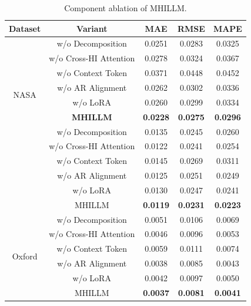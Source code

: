 \documentclass[preprint,12pt]{elsarticle}
\begin{document}
\begin{table}[t]
\centering
\caption{Component ablation of MHILLM.}
\label{tab:component_ablation}
\setlength{\tabcolsep}{8pt}
\renewcommand{\arraystretch}{1.15}
\begin{tabular}{c|c|ccc}
\hline
\textbf{Dataset} & \textbf{Variant} & \textbf{MAE} & \textbf{RMSE} & \textbf{MAPE} \\
\hline
\multirow{8}{*}{NASA}
& w/o Decomposition      & 0.0251 & 0.0283 & 0.0325 \\
& w/o Cross-HI Attention & 0.0278 & 0.0324 & 0.0367 \\
& w/o Context Token      & 0.0371 & 0.0448 & 0.0452 \\
& w/o AR Alignment       & 0.0262 & 0.0302 & 0.0336 \\
& w/o LoRA               & 0.0260 & 0.0299 & 0.0334 \\
& \textbf{MHILLM} & \textbf{0.0228} & \textbf{0.0275} & \textbf{0.0296} \\
\hline
\multirow{8}{*}{CALCE}
& w/o Decomposition      & 0.0135 & 0.0245 & 0.0260 \\
& w/o Cross-HI Attention & 0.0122 & 0.0241 & 0.0254 \\
& w/o Context Token      & 0.0145 & 0.0269 & 0.0311 \\
& w/o AR Alignment       & 0.0125 & 0.0251 & 0.0249 \\
& w/o LoRA               & 0.0130 & 0.0247 & 0.0241 \\
& MHILLM                  & \textbf{0.0119} & \textbf{0.0231} & \textbf{0.0223} \\
\hline
\multirow{8}{*}{Oxford}
& w/o Decomposition      & 0.0051 & 0.0106 & 0.0069 \\
& w/o Cross-HI Attention & 0.0046 & 0.0096 & 0.0053 \\
& w/o Context Token      & 0.0059 & 0.0111 & 0.0074 \\
& w/o AR Alignment       & 0.0038 & 0.0085 & 0.0043 \\
& w/o LoRA               & 0.0042 & 0.0097 & 0.0050 \\
& MHILLM                  & \textbf{0.0037} & \textbf{0.0081} & \textbf{0.0041} \\
\hline
\end{tabular}
\end{table}
\end{document}
